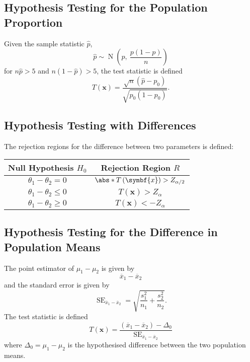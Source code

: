 \documentclass{article}
\begin{document}
\subsection{Hypothesis Testing for the Population Proportion}
Given the sample statistic \(\hat{p}\),
\begin{equation*}
    \hat{p} \sim \operatorname{N}\left( p,\: \frac{p\left( 1 - p \right)}{n} \right)
\end{equation*}
for \(n \hat{p} > 5\) and \(n \left( 1 - \hat{p} \right) > 5\),
the test statistic is defined
\begin{equation*}
    T\left( \symbf{x} \right) = \frac{\sqrt{n} \left( \hat{p} - p_0 \right)}{\sqrt{p_0 \left( 1 - p_0 \right)}}.
\end{equation*}
\subsection{Hypothesis Testing with Differences}
The rejection regions for the difference between two parameters is
defined:
\begin{center}
    \begin{tabular}{cc}
        \toprule
        \textbf{Null Hypothesis} \(H_0\) & \textbf{Rejection Region} \(R\)                     \\
        \midrule
        \(\theta_1 - \theta_2 = 0\)      & \(\abs*{T\left( \symbf{x} \right)} > Z_{\alpha/2}\) \\
        \(\theta_1 - \theta_2 \leq 0\)   & \(T\left( \symbf{x} \right) > Z_{\alpha}\)          \\
        \(\theta_1 - \theta_2 \geq 0\)   & \(T\left( \symbf{x} \right) < -Z_{\alpha}\)         \\
        \bottomrule
    \end{tabular}
\end{center}
\subsection{Hypothesis Testing for the Difference in Population Means}
The point estimator of \(\mu_1 - \mu_2\) is given by
\begin{equation*}
    \overline{x}_1 - \overline{x}_2
\end{equation*}
and the standard error is given by
\begin{equation*}
    \operatorname{SE}_{\overline{x}_1 - \overline{x}_2} = \sqrt{\frac{s_1^2}{n_1} + \frac{s_2^2}{n_2}}.
\end{equation*}
The test statistic is defined
\begin{equation*}
    T\left( \symbf{x} \right) = \frac{\left( \overline{x}_1 - \overline{x}_2 \right) - \Delta_0}{\operatorname{SE}_{\overline{x}_1 - \overline{x}_2}}
\end{equation*}
where \(\Delta_0 = \mu_1 - \mu_2\) is the hypothesised difference
between the two population means.
\end{document}
